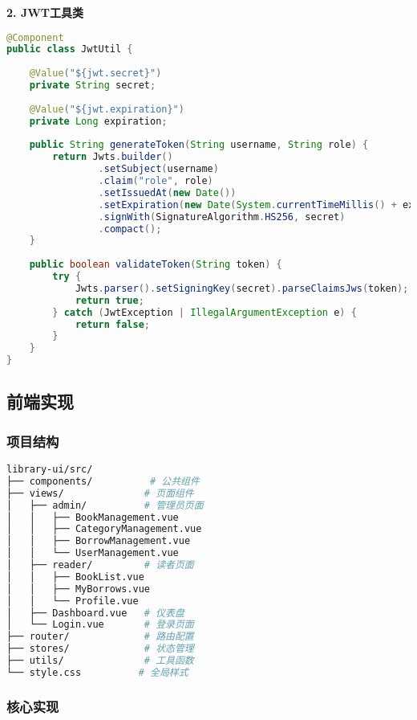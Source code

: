 \documentclass[12pt,a4paper]{article}
\begin{document}
\textbf{2. JWT工具类}
\begin{lstlisting}[language=java]
@Component
public class JwtUtil {
    
    @Value("${jwt.secret}")
    private String secret;
    
    @Value("${jwt.expiration}")
    private Long expiration;
    
    public String generateToken(String username, String role) {
        return Jwts.builder()
                .setSubject(username)
                .claim("role", role)
                .setIssuedAt(new Date())
                .setExpiration(new Date(System.currentTimeMillis() + expiration))
                .signWith(SignatureAlgorithm.HS256, secret)
                .compact();
    }
    
    public boolean validateToken(String token) {
        try {
            Jwts.parser().setSigningKey(secret).parseClaimsJws(token);
            return true;
        } catch (JwtException | IllegalArgumentException e) {
            return false;
        }
    }
}
\end{lstlisting}

\subsection{前端实现}

\subsubsection{项目结构}
\begin{lstlisting}[language=bash]
library-ui/src/
├── components/          # 公共组件
├── views/              # 页面组件
│   ├── admin/          # 管理员页面
│   │   ├── BookManagement.vue
│   │   ├── CategoryManagement.vue
│   │   ├── BorrowManagement.vue
│   │   └── UserManagement.vue
│   ├── reader/         # 读者页面
│   │   ├── BookList.vue
│   │   ├── MyBorrows.vue
│   │   └── Profile.vue
│   ├── Dashboard.vue   # 仪表盘
│   └── Login.vue       # 登录页面
├── router/             # 路由配置
├── stores/             # 状态管理
├── utils/              # 工具函数
└── style.css          # 全局样式
\end{lstlisting}

\subsubsection{核心实现}
\end{document}
